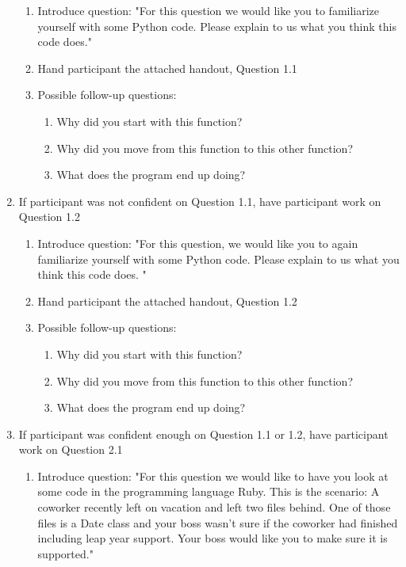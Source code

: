 \documentclass{article}
\begin{document}
\begin{enumerate}
  \begin{enumerate}
    \item Introduce question: "For this question we would like you to familiarize yourself with some Python code. Please explain to us what you think this code does."
    \item Hand participant the attached handout, Question 1.1
    \item Possible follow-up questions:
    \begin{enumerate}
      \item Why did you start with this function?
      \item Why did you move from this function to this other function?
      \item What does the program end up doing?
    \end{enumerate}
  \end{enumerate}
  \item If participant was not confident on Question 1.1, have participant work on Question 1.2
   \begin{enumerate}
    \item Introduce question: "For this question, we would like you to again familiarize yourself with some Python code. Please explain to us what you think this code does. "
    \item Hand participant the attached handout, Question 1.2
    \item Possible follow-up questions:
     \begin{enumerate}
      \item Why did you start with this function?
      \item Why did you move from this function to this other function?
      \item What does the program end up doing?
    \end{enumerate}
  \end{enumerate}
  \item If participant was confident enough on Question 1.1 or 1.2, have participant work on Question 2.1
   \begin{enumerate}
    \item Introduce question: "For this question we would like to have you look at some code in the programming language Ruby. This is the scenario: A coworker recently left on vacation and left two files behind. One of those files is a Date class and your boss wasn't sure if the coworker had finished including leap year support. Your boss would like you to make sure it is supported."

\end{enumerate}
\end{enumerate}
\end{document}
